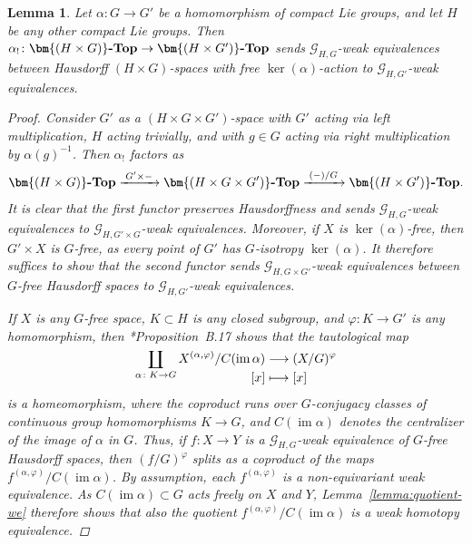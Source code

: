 \documentclass[reqno]{memo-l}
\theoremstyle{mythm}
\newtheorem{lemma}[thm]{Lemma}
\theoremstyle{definition}
\numberwithin{equation}{section}
\renewcommand{\phi}{\varphi}
\newcommand{\cat}[1]{\textbf{\textup{#1}}}
\DeclareMathOperator{\im}{im}
\begin{document}
\begin{lemma}\label{lemma:equiv-quotient}
    Let $\alpha\colon G\to G'$ be a homomorphism of compact Lie groups, and let $H$ be any other compact Lie groups. Then $\alpha_!\colon\cat{$\bm{(H\times G)}$-Top}\to \cat{$\bm{(H\times G')}$-Top}$ sends $\mathcal G_{H,G}$-weak equivalences between Hausdorff $(H\times G)$-spaces with free $\ker(\alpha)$-action to $\mathcal G_{H,G'}$-weak equivalences.
    \begin{proof}
        Consider $G'$ as a $(H\times G\times G')$-space with $G'$ acting via left multiplication, $H$ acting trivially, and with $g\in G$ acting via right multiplication by $\alpha(g)^{-1}$. Then $\alpha_!$ factors as
        \[
            \cat{$\bm{(H\times G)}$-Top}\xrightarrow{\;G'\times{-}\;}\cat{$\bm{(H\times G\times G')}$-Top}\xrightarrow{\;(-)/G\;}\cat{$\bm{(H\times G')}$-Top}.
        \]
        It is clear that the first functor preserves Hausdorffness and sends $\mathcal G_{H,G}$-weak equivalences to $\mathcal G_{H,G'\times G}$-weak equivalences. Moreover, if $X$ is $\ker(\alpha)$-free, then $G'\times X$ is $G$-free, as every point of $G'$ has $G$-isotropy $\ker(\alpha)$. It therefore suffices to show that the second functor sends $\mathcal G_{H,G\times G'}$-weak equivalences between $G$-free Hausdorff spaces to $\mathcal G_{H,G'}$-weak equivalences.

        If $X$ is any $G$-free space, $K\subset H$ is any closed subgroup, and $\phi\colon K\to G'$ is any homomorphism, then \cite{schwede2018global}*{Proposition~B.17} shows that the tautological map
        \begin{equation}\label{eq:splitting-of-fp}
            \begin{aligned}
                \smash{\coprod_{\alpha\colon K\to G}X^{(\alpha,\phi)}/C(\im\alpha)}&\longrightarrow (X/G)^\phi\\
                [x]&\longmapsto[x]
            \end{aligned}
        \end{equation}
        is a homeomorphism, where the coproduct runs over $G$-conjugacy classes of continuous group homomorphisms $K\to G$, and $C(\im\alpha)$ denotes the centralizer of the image of $\alpha$ in $G$. Thus, if $f\colon X\to Y$ is a $\mathcal G_{H,G}$-weak equivalence of $G$-free Hausdorff spaces, then $(f/G)^\phi$ splits as a coproduct of the maps $f^{(\alpha,\phi)}/C(\im\alpha)$. By assumption, each $f^{(\alpha,\phi)}$ is a non-equivariant weak equivalence. As $C(\im\alpha)\subset G$ acts freely on $X$ and $Y$, Lemma~\ref{lemma:quotient-we} therefore shows that also the quotient $f^{(\alpha,\phi)}/C(\im\alpha)$ is a weak homotopy equivalence.
    \end{proof}
\end{lemma}
\end{document}
